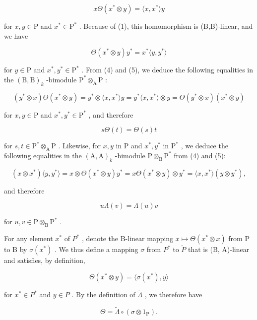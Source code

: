 \[
x \Theta (x ^ {*} \otimes y) = \langle x, x ^ {*} \rangle y\tag{4}
\]

for \(x, y \in \mathrm{P}\) and \(x^{*} \in \mathrm{P}^{*}\) . Because of (1), this homomorphism is (B,B)-linear, and we have

\[
\Theta (x ^ {*} \otimes y) y ^ {*} = x ^ {*} \langle y, y ^ {*} \rangle\tag{5}
\]

for \(y \in \mathrm{P}\) and \(x^{*}, y^{*} \in \mathrm{P}^{*}\) . From (4) and (5), we deduce the following equalities in the \((\mathrm{B}, \mathrm{B})_{k}\) -bimodule \(\mathrm{P}^{*} \otimes_{\mathrm{A}} \mathrm{P}\) :

\[
(y ^ {*} \otimes x) \Theta (x ^ {*} \otimes y) = y ^ {*} \otimes \langle x, x ^ {*} \rangle y = y ^ {*} \langle x, x ^ {*} \rangle \otimes y = \Theta (y ^ {*} \otimes x) (x ^ {*} \otimes y)
\]

for \(x, y \in \mathrm{P}\) and \(x^{*}, y^{*} \in \mathrm{P}^{*}\) , and therefore

\[
s \Theta (t) = \Theta (s) t\tag{6}
\]

for \(s, t \in \mathrm{P}^* \otimes_{\mathrm{A}} \mathrm{P}\) . Likewise, for \(x, y\) in \(\mathrm{P}\) and \(x^*, y^*\) in \(\mathrm{P}^*\) , we deduce the following equalities in the \((\mathrm{A}, \mathrm{A})_k\) -bimodule \(\mathrm{P} \otimes_{\mathrm{B}} \mathrm{P}^*\) from (4) and (5):

\[
(x \otimes x ^ {*}) \langle y, y ^ {*} \rangle = x \otimes \Theta (x ^ {*} \otimes y) y ^ {*} = x \Theta (x ^ {*} \otimes y) \otimes y ^ {*} = \langle x, x ^ {*} \rangle (y \otimes y ^ {*}),
\]

and therefore

\[
u \Lambda (v) = \Lambda (u) v\tag{7}
\]

for \(u, v \in \mathrm{P} \otimes_{\mathrm{B}} \mathrm{P}^{*}\) .

For any element \(x^{*}\) of \(P^{*}\) , denote the B-linear mapping \(x \mapsto \Theta(x^{*} \otimes x)\) from P to B by \(\sigma(x^{*})\) . We thus define a mapping \(\sigma\) from \(P^{*}\) to \(\widetilde{P}\) that is (B, A)-linear and satisfies, by definition,

\[
\Theta (x ^ {*} \otimes y) = \langle \sigma (x ^ {*}), y \rangle\tag{8}
\]

for \(x^{*} \in P^{*}\) and \(y \in P\) . By the definition of \(\widetilde{\Lambda}\) , we therefore have

\[
\Theta = \widetilde {\Lambda} \circ (\sigma \otimes 1 _ {\mathrm{P}}).\tag{9}
\]

